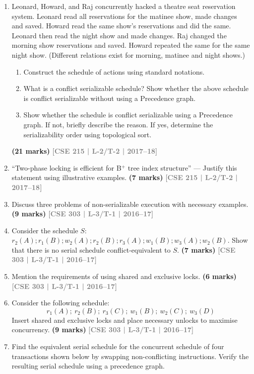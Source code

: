 \documentclass[12pt]{article}
\newcommand{\yr}[1]{\hfill\textcolor{gray}{\small\textbf{[#1]}}}
\newcommand{\mk}[1]{\textcolor{orange!70!black}{\small\textbf{(#1 marks)}}}
\begin{document}
\begin{enumerate}
\item Leonard, Howard, and Raj concurrently hacked a theatre seat reservation system. Leonard read all reservations for the matinee show, made changes and saved. Howard read the same show's reservations and did the same. Leonard then read the night show and made changes. Raj changed the morning show reservations and saved. Howard repeated the same for the same night show. (Different relations exist for morning, matinee and night shows.)
\begin{enumerate}
  \item Construct the schedule of actions using standard notations.
  \item What is a conflict serializable schedule? Show whether the above schedule is conflict serializable without using a Precedence graph.
  \item Show whether the schedule is conflict serializable using a Precedence graph. If not, briefly describe the reason. If yes, determine the serializability order using topological sort.
\end{enumerate}
  \mk{21} \yr{CSE 215 | L-2/T-2 | 2017--18}


\item ``Two-phase locking is efficient for B$^+$ tree index structure'' --- Justify this statement using illustrative examples.
\mk{7} \yr{CSE 215 | L-2/T-2 | 2017--18}


\item Discuss three problems of non-serializable execution with necessary examples.
\mk{9} \yr{CSE 303 | L-3/T-1 | 2016--17}


\item Consider the schedule $S$: $r_2(A); r_1(B); w_2(A); r_2(B); r_3(A); w_1(B); w_3(A); w_2(B)$. Show that there is no serial schedule conflict-equivalent to $S$.
\mk{7} \yr{CSE 303 | L-3/T-1 | 2016--17}


\item Mention the requirements of using shared and exclusive locks.
\mk{6} \yr{CSE 303 | L-3/T-1 | 2016--17}


\item Consider the following schedule:
\[r_1(A);\ r_2(B);\ r_3(C);\ w_1(B);\ w_2(C);\ w_3(D)\]
Insert shared and exclusive locks and place necessary unlocks to maximise concurrency.
\mk{9} \yr{CSE 303 | L-3/T-1 | 2016--17}


\item Find the equivalent serial schedule for the concurrent schedule of four transactions shown below by swapping non-conflicting instructions. Verify the resulting serial schedule using a precedence graph.


\end{enumerate}
\end{document}
